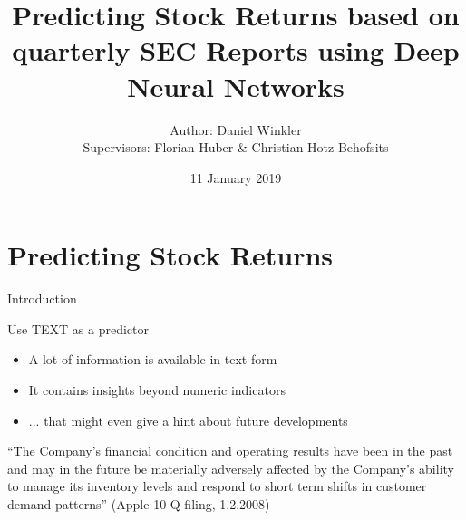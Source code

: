 \documentclass{beamer}
\title{Predicting Stock Returns based on quarterly SEC Reports using Deep Neural Networks}
\author{Author: Daniel Winkler \\ Supervisors: Florian Huber \& Christian Hotz-Behofsits}
\date{11 January 2019}
\begin{document}
\begin{frame}[plain]
  \titlepage
\end{frame}

\section{Predicting Stock Returns}
\label{sec:intro}


\begin{frame}{Introduction}
  \begin{itemize}
  \end{itemize}
\end{frame}

\begin{frame}{Use TEXT as a predictor}
  \begin{itemize}
    \item A lot of information is available in text form
    \item It contains insights beyond numeric indicators
    \item ... that might even give a hint about future developments \\
  \end{itemize}
      ``The Company's financial condition and operating results have been in the past and may in the future be materially adversely affected by the Company's ability to manage its inventory levels and respond to short term shifts in customer demand patterns'' (Apple 10-Q filing, 1.2.2008)
\end{frame}
\end{document}

